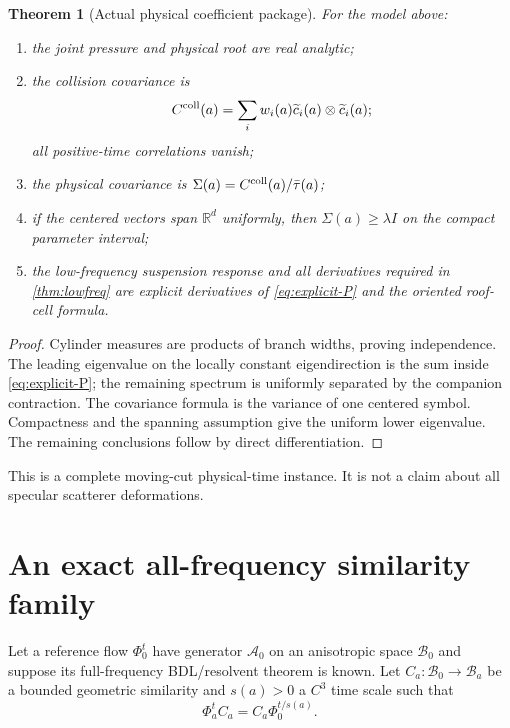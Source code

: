 \documentclass[11pt,reqno]{amsart}
\newtheorem{theorem}{Theorem}[section]
\theoremstyle{definition}
\theoremstyle{remark}
\newcommand{\B}{\mathcal B}
\newcommand{\R}{\mathbb R}
\begin{document}
\begin{theorem}[Actual physical coefficient package]\label{thm:actual}
For the model above:
\begin{enumerate}[label=(\roman*)]
\item the joint pressure and physical root are real analytic;
\item the collision covariance is
\[
 C^{\rm coll}(a)=\sum_iw_i(a)
 \widetilde c_i(a)\otimes\widetilde c_i(a);
\]
all positive-time correlations vanish;
\item the physical covariance is
$\Sigma(a)=C^{\rm coll}(a)/\bar\tau(a)$;
\item if the centered vectors span $\R^d$ uniformly, then
$\Sigma(a)\ge\lambda I$ on the compact parameter interval;
\item the low-frequency suspension response and all derivatives required in
\cref{thm:lowfreq} are explicit derivatives of \eqref{eq:explicit-P} and the
oriented roof-cell formula.
\end{enumerate}
\end{theorem}

\begin{proof}
Cylinder measures are products of branch widths, proving independence.  The
leading eigenvalue on the locally constant eigendirection is the sum inside
\eqref{eq:explicit-P}; the remaining spectrum is uniformly separated by the
companion contraction.  The covariance formula is the variance of one
centered symbol.  Compactness and the spanning assumption give the uniform
lower eigenvalue.  The remaining conclusions follow by direct differentiation.
\end{proof}

This is a complete moving-cut physical-time instance.  It is not a claim about
all specular scatterer deformations.

\section{An exact all-frequency similarity family}\label{sec:similarity}

Let a reference flow $\Phi_0^t$ have generator $\mathcal A_0$ on an
anisotropic space $\B_0$ and suppose its full-frequency BDL/resolvent theorem is
known.  Let $C_a:\B_0\to\B_a$ be a bounded geometric similarity and
$s(a)>0$ a $C^3$ time scale such that
\begin{equation}\label{eq:flow-sim}
 \Phi_a^tC_a=C_a\Phi_0^{t/s(a)}.
\end{equation}
\end{document}
